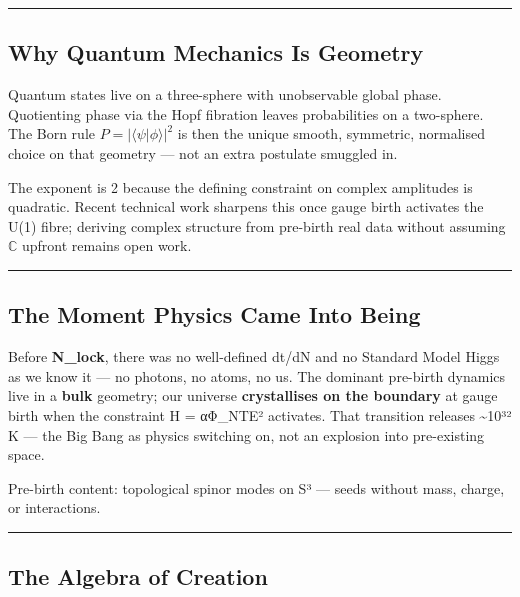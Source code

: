 \documentclass[
  11pt,
]{article}
\begin{document}
\begin{center}\rule{0.5\linewidth}{0.5pt}\end{center}

\subsection{Why Quantum Mechanics Is
Geometry}\label{why-quantum-mechanics-is-geometry}

Quantum states live on a three-sphere with unobservable global phase.
Quotienting phase via the Hopf fibration leaves probabilities on a
two-sphere. The Born rule \(P = \left|\langle\psi|\phi\rangle\right|^2\)
is then the unique smooth, symmetric, normalised choice on that geometry
--- not an extra postulate smuggled in.

The exponent is 2 because the defining constraint on complex amplitudes
is quadratic. Recent technical work sharpens this once gauge birth
activates the U(1) fibre; deriving complex structure from pre-birth real
data without assuming \(\mathbb{C}\) upfront remains open work.

\begin{center}\rule{0.5\linewidth}{0.5pt}\end{center}

\subsection{The Moment Physics Came Into
Being}\label{the-moment-physics-came-into-being}

Before \textbf{N\_lock}, there was no well-defined dt/dN and no Standard
Model Higgs as we know it --- no photons, no atoms, no us. The dominant
pre-birth dynamics live in a \textbf{bulk} geometry; our universe
\textbf{crystallises on the boundary} at gauge birth when the constraint
H = α\textbar Φ\_NTE\textbar² activates. That transition releases
\textasciitilde10³² K --- the Big Bang as physics switching on, not an
explosion into pre-existing space.

Pre-birth content: topological spinor modes on S³ --- seeds without
mass, charge, or interactions.

\begin{center}\rule{0.5\linewidth}{0.5pt}\end{center}

\subsection{The Algebra of Creation}\label{the-algebra-of-creation}
\end{document}
